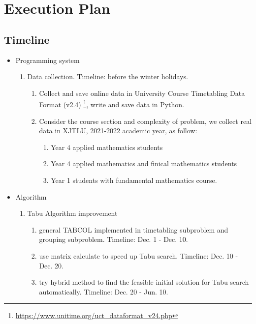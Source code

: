 \documentclass{article}
\begin{document}
\newpage

\section{Execution Plan}
\label{sec: Execution Plan}
\subsection{Timeline}
\begin{itemize}
	\item Programming system
	      \begin{enumerate}
		      \item Data collection. Timeline: before the winter holidays.
		            \begin{enumerate}
			            \item Collect and save online data in University Course Timetabling Data Format (v2.4) \footnote{\url{https://www.unitime.org/uct_dataformat_v24.php}}, write and save data in Python.
			            \item Consider the course section and complexity of problem, we collect real data in XJTLU, 2021-2022 academic year, as follow:
			                  \begin{enumerate}
				                  \item Year 4 applied mathematics students
				                  \item Year 4 applied mathematics and finical mathematics students
				                  \item Year 1 students with fundamental mathematics course.
			                  \end{enumerate}
		            \end{enumerate}
	      \end{enumerate}
	\item Algorithm
	      \begin{enumerate}
		      \item Tabu Algorithm improvement
		            \begin{enumerate}
						\item general TABCOL implemented in timetabling subproblem and grouping subproblem. Timeline: Dec. 1 - Dec. 10.
						\item use matrix calculate to speed up Tabu search. Timeline: Dec. 10 - Dec. 20.
						\item try hybrid method to find the feasible initial solution for Tabu search automatically. Timeline: Dec. 20 - Jun. 10.

\end{enumerate}
\end{enumerate}
\end{itemize}
\end{document}
